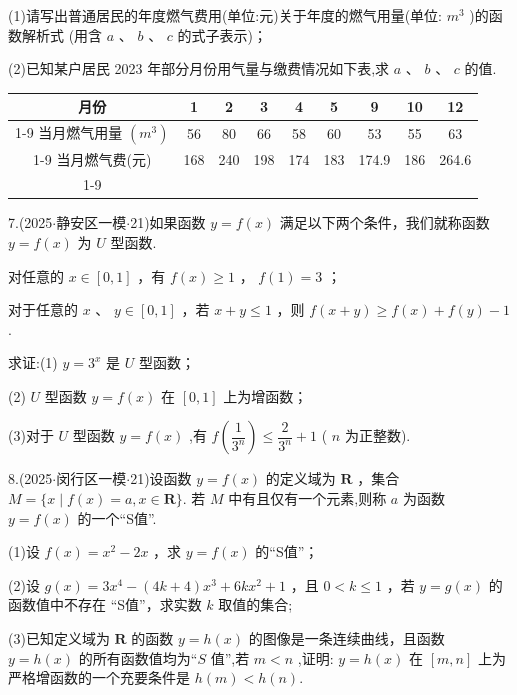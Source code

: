 (1)请写出普通居民的年度燃气费用(单位:元)关于年度的燃气用量(单位: ${{m}}^{3}$ )的函数解析式 (用含 $a$ 、 $b$ 、 $c$ 的式子表示)；

(2)已知某户居民 2023 年部分月份用气量与缴费情况如下表,求 $a$ 、 $b$ 、 $c$ 的值.

\begin{center}

\begin{tabular}{|c|c|c|c|c|c|c|c|c|}
\hline
月份 & 1 & 2 & 3 & 4 & 5 & 9 & 10 & 12 \\
\cline{1-9}
当月燃气用量 $\left( {{m}}^{3}\right)$ & 56 & 80 & 66 & 58 & 60 & 53 & 55 & 63 \\
\cline{1-9}
当月燃气费(元) & 168 & 240 & 198 & 174 & 183 & 174.9 & 186 & 264.6 \\
\cline{1-9}
\hline
\end{tabular}
\end{center}

7.(2025$\cdot$静安区一模$\cdot$21)如果函数 $y = f\left( x\right)$ 满足以下两个条件，我们就称函数 $y = f\left( x\right)$ 为 $U$ 型函数.

   对任意的 $x \in  \left\lbrack  {0,1}\right\rbrack$ ，有 $f\left( x\right)  \geq  1$ ， $f\left( 1\right)  = 3$ ；

   对于任意的 $x$ 、 $y \in  \left\lbrack  {0,1}\right\rbrack$ ，若 $x + y \leq  1$ ，则 $f\left( {x + y}\right)  \geq  f\left( x\right)  + f\left( y\right)  - 1$.

求证:(1) $y = {3}^{x}$ 是 $U$ 型函数；

(2) $U$ 型函数 $y = f\left( x\right)$ 在 $\left\lbrack  {0,1}\right\rbrack$ 上为增函数；

(3)对于 $U$ 型函数 $y = f\left( x\right)$ ,有 $f\left( \dfrac{1}{{3}^{n}}\right)  \leq  \dfrac{2}{{3}^{n}} + 1$ ( $n$ 为正整数).

8.(2025$\cdot$闵行区一模$\cdot$21)设函数 $y = f\left( x\right)$ 的定义域为 $\mathbf{R}$ ，集合 $M = \{ x \mid  f\left( x\right)  = a,x \in  \mathbf{R}\}$. 若 $M$ 中有且仅有一个元素,则称 $a$ 为函数 $y = f\left( x\right)$ 的一个“S值”.

(1)设 $f\left( x\right)  = {x}^{2} - {2x}$ ，求 $y = f\left( x\right)$ 的“S值”；

(2)设 $g\left( x\right)  = 3{x}^{4} - \left( {{4k} + 4}\right) {x}^{3} + {6k}{x}^{2} + 1$ ，且 $0 < k \leq  1$ ，若 $y = g\left( x\right)$ 的函数值中不存在 “S值”，求实数 $k$ 取值的集合;

(3)已知定义域为 $\mathbf{R}$ 的函数 $y = h\left( x\right)$ 的图像是一条连续曲线，且函数 $y = h\left( x\right)$ 的所有函数值均为“$S$ 值”,若 $m < n$ ,证明: $y = h\left( x\right)$ 在 $\left\lbrack  {m,n}\right\rbrack$ 上为严格增函数的一个充要条件是 $h\left( m\right)  < h\left( n\right)$.

